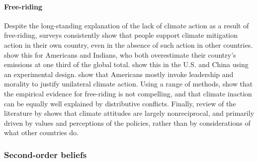 \paragraph{Free-riding}

Despite the long-standing explanation of the lack of climate action as a result of free-riding, surveys consistently show that people support climate mitigation action in their own country, even in the absence of such action in other countries. \citet{bernauer_how_2015} show this for Americans and Indians, who both overestimate their country's emissions at one third of the global total. \citet{beiser-mcgrath_commitment_2019} show this in the U.S. and China using an experimental design. \citet{mcevoy_prospects_2016} show that Americans mostly invoke leadership and morality to justify unilateral climate action. Using a range of methods, \citet{aklin_prisoners_2020} show that the empirical evidence for free-riding is not compelling, and that climate inaction can be equally well explained by distributive conflicts. Finally, review of the literature by \citet{mcgrath_how_2017} shows that climate attitudes are largely nonreciprocal, and primarily driven by values and perceptions of the policies, rather than by considerations of what other countries do.

\subsubsection{Second-order beliefs}\label{subsubsec:literature_beliefs}

